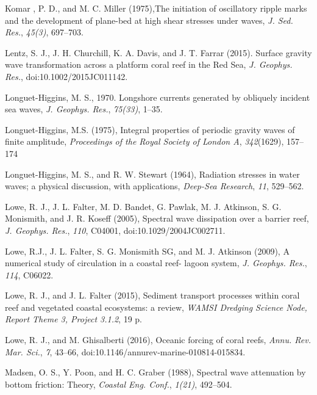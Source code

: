 \documentclass[default,jgrga]{agutex2015}
\begin{document}
\begin{article}
\begin{thebibliography}{}
Komar , P. D., and M. C. Miller (1975),The initiation of oscillatory ripple marks and the development of plane-bed at high shear stresses under waves, \textit{J. Sed. Res.}, \textit{45(3)}, 697--703.

Lentz, S. J., J. H. Churchill, K. A. Davis, and J. T. Farrar (2015). Surface gravity wave transformation across a platform coral reef in the Red Sea, \textit{J. Geophys. Res.}, doi:10.1002/2015JC011142.

Longuet-Higgins, M. S., 1970. Longshore currents generated by obliquely incident sea waves, \textit{J. Geophys. Res.}, \textit{75(33)}, 1--35.

Longuet-Higgins, M.S. (1975), Integral properties of periodic gravity waves of finite amplitude, \textit{Proceedings of the Royal Society of London A}, \textit{342}(1629), 157--174

Longuet-Higgins, M. S., and R. W. Stewart (1964), Radiation stresses in water waves; a physical discussion, with applications, \textit{Deep-Sea Research}, \textit{11}, 529--562.

Lowe, R. J., J. L. Falter, M. D. Bandet, G. Pawlak, M. J. Atkinson, S. G. Monismith, and J. R. Koseff (2005), Spectral wave dissipation over a barrier reef, \textit{J. Geophys. Res.}, \textit{110}, C04001, doi:10.1029/2004JC002711.

Lowe, R.J., J. L. Falter, S. G. Monismith SG, and M. J. Atkinson (2009), A numerical study of circulation in a coastal reef-
lagoon system, \textit{J. Geophys. Res.}, \textit{114}, C06022.

Lowe, R. J., and J. L. Falter (2015), Sediment transport processes within coral reef and vegetated coastal ecosystems: a review, \textit{WAMSI Dredging Science Node, Report Theme 3, Project 3.1.2}, 19 p.

Lowe, R. J., and M. Ghisalberti (2016), Oceanic forcing of coral reefs, \textit{Annu. Rev. Mar. Sci.}, \textit{7}, 43--66, doi:10.1146/annurev-marine-010814-015834.

Madsen, O. S., Y. Poon, and H. C. Graber (1988), Spectral wave attenuation by bottom friction: Theory, \textit{Coastal Eng. Conf.}, \textit{1(21)}, 492--504.


\end{thebibliography}
\end{article}
\end{document}
